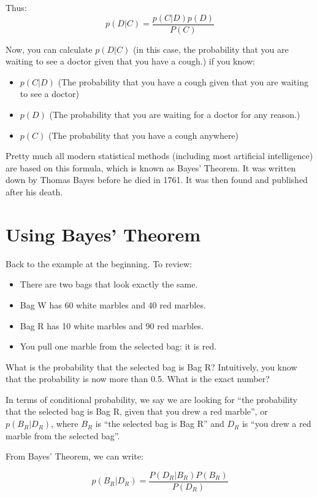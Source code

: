 Thus:
$$p(D | C) = \frac {p(C | D)p(D)}{P(C)}$$

Now, you can calculate $p(D | C)$ (in this case, the probability that
you are waiting to see a doctor given that you have a cough.) if you
know:

\begin{itemize}
\item $p(C | D)$ (The probability that you have a cough given that you are waiting to see a doctor)
\item $p(D)$ (The probability that you are waiting for a doctor for any reason.)
\item $p(C)$ (The probability that you have a cough anywhere)
\end{itemize}

Pretty much all modern statistical methods (including most artificial
intelligence) are based on this formula, which is known as Bayes'
Theorem. It was written down by Thomas Bayes before he died in
1761. It was then found and published after his death.

\section{Using Bayes' Theorem}

Back to the example at the beginning. To review:

\begin{itemize}
\item There are two bags that look exactly the same.
\item Bag W has 60 white marbles and 40 red marbles.
\item Bag R has 10 white marbles and 90 red marbles.
\item You pull one marble from the selected bag: it is red.
\end{itemize}

What is the probability that the selected bag is Bag R? Intuitively,
you know that the probability is now more than 0.5. What is the exact
number?

In terms of conditional probability, we say we are looking for ``the probability
that the selected bag is Bag R, given that you drew a red marble'', or
$p(B_R | D_R)$, where $B_R$ is ``the selected bag is Bag R'' and $D_R$ is
``you drew a red marble from the selected bag''.

From Bayes' Theorem, we can write:

$$p(B_R | D_R) = \frac{ P(D_R | B_R) P(B_R) } {P(D_R)}$$


